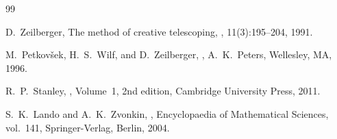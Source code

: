 \begin{thebibliography}{99}

D.~Zeilberger,
\newblock The method of creative telescoping,
, 11(3):195--204, 1991.

M.~Petkov\v{s}ek, H.~S.~Wilf, and D.~Zeilberger,
,
\newblock A.~K.~Peters, Wellesley, MA, 1996.

R.~P.~Stanley,
, Volume~1, 2nd edition,
\newblock Cambridge University Press, 2011.

S.~K.~Lando and A.~K.~Zvonkin,
,
\newblock Encyclopaedia of Mathematical Sciences, vol.~141,
\newblock Springer-Verlag, Berlin, 2004.

\end{thebibliography}

